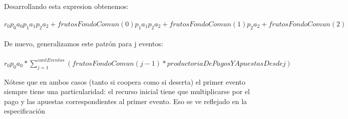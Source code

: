 \documentclass[10pt,a4paper]{article}
\begin{document}
\begin{itemize}
\begin{enumerate}
 \\
    Desarrollando esta expresion obtenemos: \\ \\
    $r_0 p_0 a_0 p_1 a_1 p_2 a_2 + frutosFondoComun(0) p_1 a_1 p_2 a_2 + frutosFondoComun(1) p_2 a_2 + frutosFondoComun(2)$
    \\ \\
    De nuevo, generalizamos este patrón para j eventos:\\
    \\
    $r_0p_0a_0 *\sum_{j=1}^{cantEventos}{(frutosFondoComun(j-1)*productoriaDePagosYApuestasDesdej)}$
\end{enumerate}
\end{itemize}

Nótese que en ambos casos (tanto si coopera como si deserta) el primer evento siempre tiene una particularidad: el recurso inicial tiene que multiplicarse por el pago y las apuestas correspondientes al primer evento. Eso se ve reflejado en la especificación
\\
\\
\\
\end{document}
